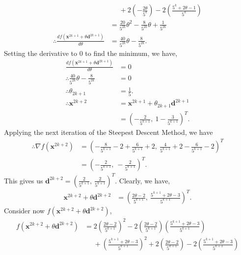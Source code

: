 \documentclass[a4paper,11pt]{article}
\newcommand{\ds}{\displaystyle}
\begin{document}
{{\begin{enumerate}[leftmargin=*]
\begin{enumerate}[label=\alph*)]
\begin{align*}
																			   &\phantom{{}={}} + 2\left(-\frac{2\theta}{5^k}\right) - 2\left(\frac{5^k+2\theta -1}{5^k}\right)\\
																			   & = \frac{20}{5^{2k}}\theta^2 -\frac{8}{5^{2k}}\theta + \frac{1}{5^{2k}} \\
						\therefore \frac{df\left(\mathbf{x}^{2k+1} + \theta \mathbf{d}^{2k+1}\right)}{d\theta} & = \frac{40}{5^{2k}}\theta -\frac{8}{5^{2k}}.
					\end{align*}
					Setting the derivative to 0 to find the minimum, we have,
					\begin{align*}
						\frac{df\left(\mathbf{x}^{2k+1} + \theta \mathbf{d}^{2k+1}\right)}{d\theta} & = 0 \\
						\therefore \frac{40}{5^{2k}}\theta -\frac{8}{5^{2k}} & = 0 \\
						\therefore \theta_{2k+1} & = \frac{1}{5}. \\
						\therefore \mathbf{x}^{2k+2} & = \mathbf{x}^{2k+1} + \theta_{2k+1} \mathbf{d}^{2k+1} \\
													 & = \left(-\frac{2}{5^{k+1}}, \:1-\frac{3}{5^{k+1}}\right)^T.
					\end{align*}
					Applying the next iteration of the Steepest Descent Method, we have 
					\begin{align*}
						\therefore \nabla f(\mathbf{x}^{2k+2}) & = \left(-\frac{8}{5^{k+1}}-2 + \frac{6}{5^{k+1}} + 2, \: \frac{4}{5^{k+1}} + 2 - \frac{6}{5^{k+1}} - 2\right)^T \\
															   & = \left(-\frac{2}{5^{k+1}}, \:-\frac{2}{5^{k+1}}\right)^T.
					\end{align*}
					This gives us $\ds{\mathbf{d}^{2k+2} = \left(\frac{2}{5^{k+1}}, \:\frac{2}{5^{k+1}}\right)^T}$. Clearly, we have,
					\begin{align*}
						\mathbf{x}^{2k+2} + \theta \mathbf{d}^{2k+2} & = \left(\frac{2\theta-2}{5^{k+1}}, \:\frac{5^{k+1}+2\theta -3}{5^{k+1}}\right)^T.
					\end{align*}
					Consider now $\ds{f\left(\mathbf{x}^{2k+2} + \theta \mathbf{d}^{2k+2}\right)}$,
					\begin{align*}
						f\left(\mathbf{x}^{2k+2} + \theta \mathbf{d}^{2k+2}\right) & = 2\left(\frac{2\theta-2}{5^{k+1}}\right)^2 - 2\left(\frac{2\theta-2}{5^{k+1}}\right)\left(\frac{5^{k+1}+2\theta -3}{5^{k+1}}\right) \\
							&\phantom{{}={}}+ \left(\frac{5^{k+1}+2\theta -3}{5^{k+1}}\right)^2 + 2\left(\frac{2\theta-2}{5^{k+1}}\right) - 2\left(\frac{5^{k+1}+2\theta -3}{5^{k+1}}\right)\\

\end{align*}
\end{enumerate}
\end{enumerate}}}
\end{document}
